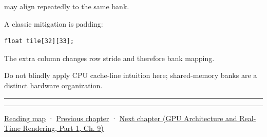 may align repeatedly to the same bank.

A classic mitigation is padding:

\protect{}\label{ucsz3u}%
\begin{verbatim}
float tile[32][33];
\end{verbatim}

The extra column changes row stride and therefore bank mapping.

Do not blindly apply CPU cache-line intuition here; shared-memory banks are a distinct hardware organization.

\begin{center}\rule{0.5\linewidth}{0.5pt}\end{center}

\begin{center}\rule{0.5\linewidth}{0.5pt}\end{center}

\hyperref[volume-reading-map]{Reading map} · \hyperref[03-visual-computing-i-ch014-transparency-blending-and-visibility]{Previous chapter} · \href{../06-GPU-Architecture-and-Real-Time-Rendering-P01/main.pdf\#nameddest=03-visual-computing-i-ch016-gpu-memory-divergence-and-execution-order}{Next chapter (GPU Architecture and Real-Time Rendering, Part 1, Ch. 9)}
